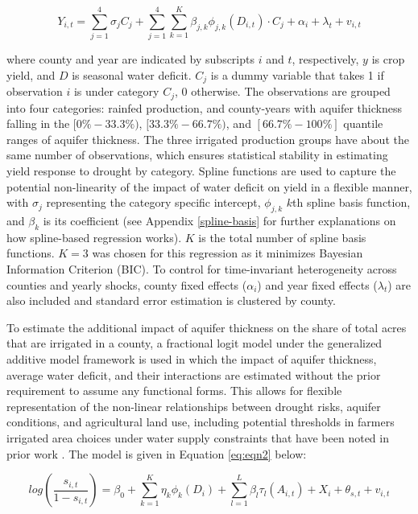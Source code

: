 \documentclass[
]{article}
\begin{document}
\begin{equation}
Y_{i,t} = \sum_{j=1}^4 \sigma_j C_j + \sum_{j=1}^4 \sum_{k=1}^K \beta_{j,k}\phi_{j,k}(D_{i,t})\cdot C_j  + \alpha_i + \lambda_t + v_{i,t} \label{eq:eqn1}
\end{equation}

where county and year are indicated by subscripts \(i\) and \(t\), respectively, \(y\) is crop yield, and \(D\) is seasonal water deficit. \(C_j\) is a dummy variable that takes 1 if observation \(i\) is under category \(C_j\), 0 otherwise. The observations are grouped into four categories: rainfed production, and county-years with aquifer thickness falling in the \([0\%-33.3\%)\), \([33.3\%-66.7\%)\), and \([66.7\% - 100\%]\) quantile ranges of aquifer thickness. The three irrigated production groups have about the same number of observations, which ensures statistical stability in estimating yield response to drought by category. Spline functions are used to capture the potential non-linearity of the impact of water deficit on yield in a flexible manner, with \(\sigma_j\) representing the category specific intercept, \(\phi_{j,k}\) \(k\)th spline basis function, and \(\beta_k\) is its coefficient (see Appendix \ref{spline-basis} for further explanations on how spline-based regression works). $K$ is the total number of spline basis functions. $K = 3$ was chosen for this regression as it minimizes Bayesian Information Criterion (BIC). To control for time-invariant heterogeneity across counties and yearly shocks, county fixed effects (\(\alpha_i\)) and year fixed effects (\(\lambda_t\)) are also included and standard error estimation is clustered by county.

To estimate the additional impact of aquifer thickness on the share of total acres that are irrigated in a county, a fractional logit model under the generalized additive model framework is used in which the impact of aquifer thickness, average water deficit, and their interactions are estimated without the prior requirement to assume any functional forms. This allows for flexible representation of the non-linear relationships between drought risks, aquifer conditions, and agricultural land use, including potential thresholds in farmers irrigated area choices under water supply constraints that have been noted in prior work \citep{foster2015well, foster2015analysis, hrozencik2017heterogeneous}. The model is given in Equation \eqref{eq:eqn2} below:

\begin{equation}
    log(\frac{s_{i,t}}{1-s_{i,t}}) = \beta_0 + \sum_{k=1}^K \eta_{k}\phi_{k}(D_{i}) + \sum_{l=1}^L \beta_{l}\tau_{l}(A_{i,t}) + X_i + \theta_{s,t} + v_{i,t} \label{eq:eqn2}
\end{equation}
\end{document}
